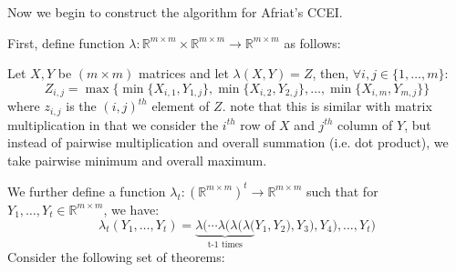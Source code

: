 \documentclass{article} %
\theoremstyle{style1}
\theoremstyle{style1}
\theoremstyle{example}
\begin{document}
Now we begin to construct the algorithm for Afriat's CCEI.

First, define function $\lambda:\mathbb{R}^{m\times m} \times \mathbb{R}^{m\times m} \to \mathbb{R}^{m\times m}$ as follows:

Let $X,Y$ be $(m\times m)$ matrices and let $\lambda(X,Y)=Z$, then, $\forall i,j\in\{1,\ldots,m\}$:
$$Z_{i,j}=\max\{\min\{X_{i,1}, Y_{1,j}\}, \min\{X_{i,2}, Y_{2,j}\}, \ldots, \min\{X_{i,m}, Y_{m,j}\}\}$$
where $z_{i,j}$ is the $(i,j)^{th}$ element of $Z$. note that this is similar with matrix multiplication in that we consider the $i^{th}$ row of $X$ and $j^{th}$ column of $Y$, but instead of pairwise multiplication and overall summation (i.e. dot product), we take pairwise minimum and overall maximum.

We further define a function $\lambda_t:(\mathbb{R}^{m\times m})^t\to\mathbb{R}^{m\times m}$ such that for $Y_1,\ldots,Y_t\in \mathbb{R}^{m\times m}$, we have:
\[
  \lambda_t(Y_1,\ldots, Y_t) =
    \underbrace{\lambda(\cdots\lambda(\lambda(\lambda(}_\text{t-1 times}
    Y_1,Y_2),Y_3),Y_4),\ldots, Y_t)
\]
Consider the following set of theorems:
\end{document}
